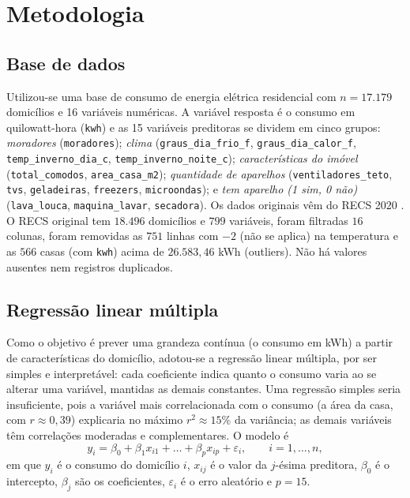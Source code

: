 %

\chapter{Metodologia}

\section{Base de dados}

\begingroup\sloppy
Utilizou-se uma base de consumo de energia elétrica residencial com
$n = 17.179$ domicílios e 16 variáveis numéricas. A variável resposta é o
consumo em quilowatt-hora (\texttt{kwh}) e as 15 variáveis preditoras se
dividem em cinco grupos: \emph{moradores} (\texttt{moradores});
\emph{clima} (\texttt{graus\_dia\_frio\_f}, \texttt{graus\_dia\_calor\_f},
\texttt{temp\_inverno\_dia\_c}, \texttt{temp\_inverno\_noite\_c});
\emph{características do imóvel} (\texttt{total\_comodos},
\texttt{area\_casa\_m2}); \emph{quantidade de aparelhos}
(\texttt{ventiladores\_teto}, \texttt{tvs}, \texttt{geladeiras}, \texttt{freezers}, \texttt{microondas}); e \emph{tem aparelho (1 sim, 0 não)} (\texttt{lava\_louca}, \texttt{maquina\_lavar}, \texttt{secadora}).
Os dados originais vêm do RECS 2020 \cite{eia2020recs}. O RECS original tem $18.496$ domicílios e $799$ variáveis, foram filtradas $16$ colunas,
foram removidas as $751$ linhas com $-2$ (não se aplica) na temperatura e as $566$ casas (com \texttt{kwh}) acima de $26.583{,}46$ kWh (outliers). Não há valores ausentes nem registros duplicados.
\par\endgroup

\section{Regressão linear múltipla}

Como o objetivo é prever uma grandeza contínua (o consumo em kWh) a partir de
características do domicílio, adotou-se a regressão linear múltipla, por ser
simples e interpretável: cada coeficiente indica quanto o consumo varia ao se
alterar uma variável, mantidas as demais constantes. Uma regressão simples
seria insuficiente, pois a variável mais correlacionada com o consumo (a área
da casa, com $r \approx 0{,}39$) explicaria no máximo $r^2 \approx 15\%$ da
variância; as demais variáveis têm correlações moderadas e complementares. O
modelo é
\begin{equation}
  y_i = \beta_0 + \beta_1 x_{i1} + \dots + \beta_p x_{ip} + \varepsilon_i,
  \qquad i = 1, \dots, n,
  \label{eq:modelo}
\end{equation}
em que $y_i$ é o consumo do domicílio $i$, $x_{ij}$ é o valor da $j$-ésima
preditora, $\beta_0$ é o intercepto, $\beta_j$ são os coeficientes,
$\varepsilon_i$ é o erro aleatório e $p = 15$.


